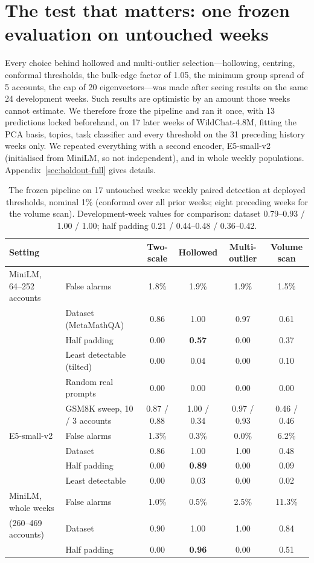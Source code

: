 \section{The test that matters: one frozen evaluation on untouched weeks}
\label{sec:holdout}

Every choice behind hollowed and multi-outlier selection---hollowing, centring, conformal thresholds, the bulk-edge factor of 1.05, the minimum group spread of 5 accounts, the cap of 20 eigenvectors---was made after seeing results on the same 24 development weeks. Such results are optimistic by an amount those weeks cannot estimate. We therefore froze the pipeline and ran it once, with 13 predictions locked beforehand, on 17 later weeks of WildChat-4.8M, fitting the PCA basis, topics, task classifier and every threshold on the 31 preceding history weeks only. We repeated everything with a second encoder, E5-small-v2 (initialised from MiniLM, so not independent), and in whole weekly populations. Appendix~\ref{sec:holdout-full} gives details.

\begin{table}[t]
\caption{The frozen pipeline on 17 untouched weeks: weekly paired detection at deployed thresholds, nominal 1\% (conformal over all prior weeks; eight preceding weeks for the volume scan). Development-week values for comparison: dataset 0.79--0.93 / 1.00 / 1.00; half padding 0.21 / 0.44--0.48 / 0.36--0.42.}
\label{tab:holdout}
\begin{center}
\footnotesize\setlength{\tabcolsep}{3.5pt}
\begin{tabular}{llcccc}
\toprule
Setting & & Two-scale & Hollowed & Multi-outlier & Volume scan \\
\midrule
MiniLM, 64--252 accounts & False alarms & 1.8\% & 1.9\% & 1.9\% & 1.5\% \\
 & Dataset (MetaMathQA) & 0.86 & 1.00 & 0.97 & 0.61 \\
 & Half padding & 0.00 & \textbf{0.57} & 0.00 & 0.37 \\
 & Least detectable (tilted) & 0.00 & 0.04 & 0.00 & 0.10 \\
 & Random real prompts & 0.00 & 0.00 & 0.00 & 0.00 \\
 & GSM8K sweep, 10 / 3 accounts & 0.87 / 0.88 & 1.00 / 0.34 & 0.97 / 0.93 & 0.46 / 0.46 \\
\midrule
E5-small-v2 & False alarms & 1.3\% & 0.3\% & 0.0\% & 6.2\% \\
 & Dataset & 0.86 & 1.00 & 1.00 & 0.48 \\
 & Half padding & 0.00 & \textbf{0.89} & 0.00 & 0.09 \\
 & Least detectable & 0.00 & 0.03 & 0.00 & 0.02 \\
\midrule
MiniLM, whole weeks & False alarms & 1.0\% & 0.5\% & 2.5\% & 11.3\% \\
(260--469 accounts) & Dataset & 0.90 & 1.00 & 1.00 & 0.84 \\
 & Half padding & 0.00 & \textbf{0.96} & 0.00 & 0.51 \\
\bottomrule
\end{tabular}
\end{center}
\end{table}

